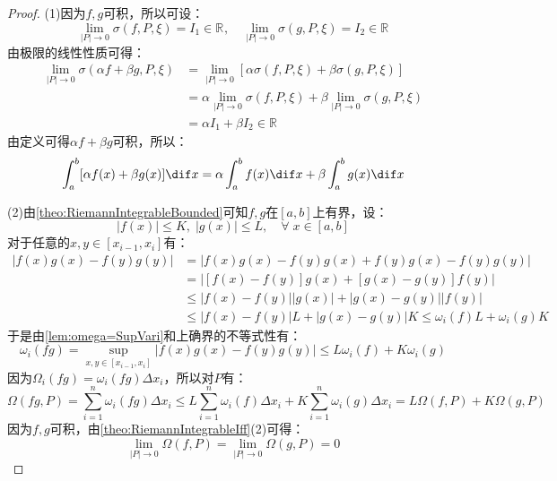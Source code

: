 \begin{proof}
	(1)因为$f,g$可积，所以可设：
	\begin{equation*}
		\lim_{|P|\to0}\sigma(f,P,\xi)=I_1\in\mathbb{R}^{},\quad\lim_{|P|\to0}\sigma(g,P,\xi)=I_2\in\mathbb{R}^{}
	\end{equation*}
	由极限的线性性质可得：
	\begin{align*}
		\lim_{|P|\to0}\sigma(\alpha f+\beta g,P,\xi)&=\lim_{|P|\to0}[\alpha\sigma(f,P,\xi)+\beta\sigma(g,P,\xi)] \\
		&=\alpha\lim_{|P|\to0}\sigma(f,P,\xi)+\beta\lim_{|P|\to0}\sigma(g,P,\xi) \\
		&=\alpha I_1+\beta I_2\in\mathbb{R}^{}
	\end{align*}
	由定义可得$\alpha f+\beta g$可积，所以：
	\begin{equation*}
		\int_{a}^b[\alpha f(x)+\beta g(x)]\dif x=\alpha\int_{a}^bf(x)\dif x+\beta\int_{a}^bg(x)\dif x
	\end{equation*}\par
	(2)由\cref{theo:RiemannIntegrableBounded}可知$f,g$在$[a,b]$上有界，设：
	\begin{equation*}
		|f(x)|\leqslant K,\;|g(x)|\leqslant L,\quad\forall\;x\in[a,b]
	\end{equation*}
	对于任意的$x,y\in[x_{i-1},x_i]$有：
	\begin{align*}
		|f(x)g(x)-f(y)g(y)|&=|f(x)g(x)-f(y)g(x)+f(y)g(x)-f(y)g(y)| \\
		&=|[f(x)-f(y)]g(x)+[g(x)-g(y)]f(y)| \\
		&\leqslant|f(x)-f(y)||g(x)|+|g(x)-g(y)||f(y)| \\
		&\leqslant|f(x)-f(y)|L+|g(x)-g(y)|K\leqslant\omega_i(f)L+\omega_i(g)K
	\end{align*}
	于是由\cref{lem:omega=SupVari}和上确界的不等式性有：
	\begin{equation*}
		\omega_i(fg)=\sup_{x,y\in[x_{i-1},x_i]}|f(x)g(x)-f(y)g(y)|\leqslant L\omega_i(f)+K\omega_i(g)
	\end{equation*}
	因为$\Omega_i(fg)=\omega_i(fg)\Delta x_i$，所以对$P$有：
	\begin{equation*}
		\Omega(fg,P)=\sum_{i=1}^{n}\omega_i(fg)\Delta x_i\leqslant L\sum_{i=1}^{n}\omega_i(f)\Delta x_i+K\sum_{i=1}^{n}\omega_i(g)\Delta x_i=L\Omega(f,P)+K\Omega(g,P)
	\end{equation*}
	因为$f,g$可积，由\cref{theo:RiemannIntegrableIff}(2)可得：
	\begin{equation*}
		\lim_{|P|\to0}\Omega(f,P)=\lim_{|P|\to0}\Omega(g,P)=0
	\end{equation*}

\end{proof}
